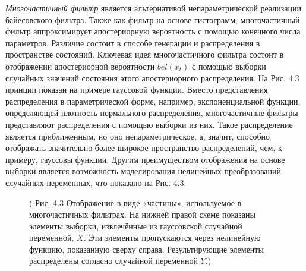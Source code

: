 \documentclass[10pt,a4paper]{article}
\begin{document}
\textit{Многочастичный фильтр} является альтернативой непараметрической реализации байесовского фильтра. Также как фильтр на основе гистограмм, многочастичный фильтр аппроксимирует апостериорную вероятность с помощью конечного числа параметров. Различие состоит в способе генерации и распределения в пространстве состояний. Ключевая идея многочастичного фильтра состоит в отображении апостериорной вероятности $bel(x_t)$ с помощью выборки случайных значений состояния этого апостериорного распределения. На Рис. 4.3 принцип показан на примере гауссовой функции. Вместо представления распределения в параметрической форме, например, экспоненциальной функции, определяющей плотность нормального распределения, многочастичные фильтры представляют распределения с помощью выборки из них. Такое распределение является приближенным, но оно непараметрическое, а, значит, способно отображать значительно более широкое пространство распределений, чем, к примеру, гауссовы функции. Другим преимуществом отображения на основе выборки является возможность моделирования нелинейных преобразований случайных переменных, что показано на Рис. 4.3.\\
\begin{figure}[H]
	\caption{ (  Рис. 4.3 Отображение в виде «частицы», используемое в многочастичных фильтрах. На нижней правой схеме показаны элементы выборки, извлечённые из гауссовской случайной переменной, $X$. Эти элементы пропускаются через нелинейную функцию, показанную сверху справа. Результирующие элементы распределены согласно случайной переменной $Y$.)}
	\label{fig:43orig}
\end{figure}
 
\end{document}
